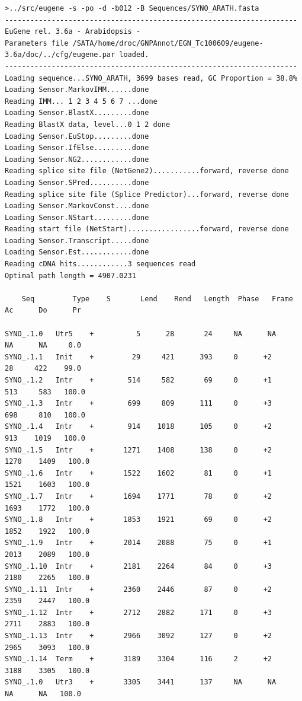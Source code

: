 \documentclass[a4paper,titlepage]{report}
\begin{document}
\begin{Verbatim}[fontsize=\scriptsize]
>../src/eugene -s -po -d -b012 -B Sequences/SYNO_ARATH.fasta
---------------------------------------------------------------------
EuGene rel. 3.6a - Arabidopsis -
Parameters file /SATA/home/droc/GNPAnnot/EGN_Tc100609/eugene-3.6a/doc/../cfg/eugene.par loaded.
---------------------------------------------------------------------
Loading sequence...SYNO_ARATH, 3699 bases read, GC Proportion = 38.8%
Loading Sensor.MarkovIMM......done
Reading IMM... 1 2 3 4 5 6 7 ...done
Loading Sensor.BlastX.........done
Reading BlastX data, level...0 1 2 done
Loading Sensor.EuStop.........done
Loading Sensor.IfElse.........done
Loading Sensor.NG2............done
Reading splice site file (NetGene2)...........forward, reverse done
Loading Sensor.SPred..........done
Reading splice site file (Splice Predictor)...forward, reverse done
Loading Sensor.MarkovConst....done
Loading Sensor.NStart.........done
Reading start file (NetStart).................forward, reverse done
Loading Sensor.Transcript.....done
Loading Sensor.Est............done
Reading cDNA hits............3 sequences read
Optimal path length = 4907.0231

    Seq         Type    S       Lend    Rend   Length  Phase   Frame      Ac      Do      Pr

SYNO_.1.0	Utr5    +          5      28       24     NA      NA      NA      NA     0.0  
SYNO_.1.1	Init    +         29     421      393     0      +2      28     422    99.0  
SYNO_.1.2	Intr    +        514     582       69     0      +1     513     583   100.0  
SYNO_.1.3	Intr    +        699     809      111     0      +3     698     810   100.0  
SYNO_.1.4	Intr    +        914    1018      105     0      +2     913    1019   100.0  
SYNO_.1.5	Intr    +       1271    1408      138     0      +2    1270    1409   100.0  
SYNO_.1.6	Intr    +       1522    1602       81     0      +1    1521    1603   100.0  
SYNO_.1.7	Intr    +       1694    1771       78     0      +2    1693    1772   100.0  
SYNO_.1.8	Intr    +       1853    1921       69     0      +2    1852    1922   100.0  
SYNO_.1.9	Intr    +       2014    2088       75     0      +1    2013    2089   100.0  
SYNO_.1.10	Intr    +       2181    2264       84     0      +3    2180    2265   100.0  
SYNO_.1.11	Intr    +       2360    2446       87     0      +2    2359    2447   100.0  
SYNO_.1.12	Intr    +       2712    2882      171     0      +3    2711    2883   100.0  
SYNO_.1.13	Intr    +       2966    3092      127     0      +2    2965    3093   100.0  
SYNO_.1.14	Term    +       3189    3304      116     2      +2    3188    3305   100.0  
SYNO_.1.0	Utr3    +       3305    3441      137     NA      NA      NA      NA   100.0  


\end{Verbatim}
\end{document}
